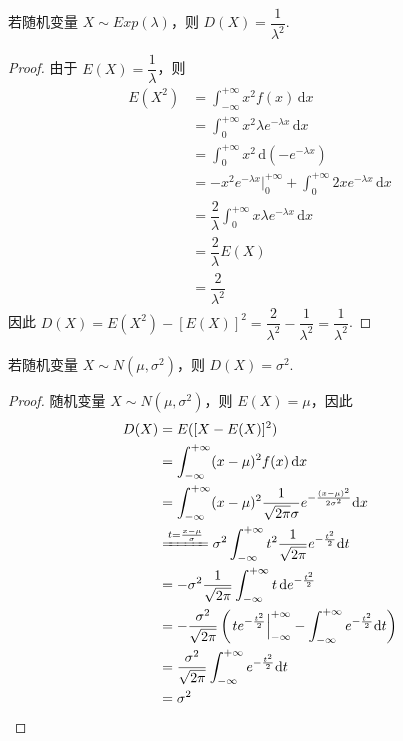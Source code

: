 \begin{conclusion}
    \indent 若随机变量 $X \sim Exp(\lambda)$，则 $D(X) = \dfrac{1}{\lambda^2}$.
\end{conclusion}

\begin{proof}
    由于 $E(X) = \dfrac{1}{\lambda}$，则
    $$
    \begin{aligned}
        E(X^2) &= \int_{-\infty}^{+\infty} x^2 f(x) \, \text{d}x \\
        &= \int_0^{+\infty} x^2 \lambda e^{-\lambda x} \, \text{d}x \\
        &= \int_0^{+\infty} x^2 \, \text{d}(-e^{-\lambda x}) \\
        &= -x^2 e^{-\lambda x} \Big|_0^{+\infty} + \int_0^{+\infty} 2x e^{-\lambda x} \, \text{d}x \\
        &= \dfrac{2}{\lambda} \int_0^{+\infty} x \lambda e^{-\lambda x} \, \text{d}x \\
        &= \dfrac{2}{\lambda} E(X) \\
        &= \dfrac{2}{\lambda^2}
    \end{aligned}
    $$
    因此 $D(X) = E(X^2) - [E(X)]^2 = \dfrac{2}{\lambda^2} - \dfrac{1}{\lambda^2} = \dfrac{1}{\lambda^2}$.
\end{proof}

\begin{conclusion}
    \indent 若随机变量 $X \sim N(\mu,\sigma^2)$，则 $D(X) = \sigma^2$.
\end{conclusion}

\begin{proof}
    随机变量 $X \sim N(\mu,\sigma^2)$，则 $E(X)=\mu$，因此
    $$
    \begin{aligned}
        D(X) &= E([X-E(X)]^2) \\
        &= \int_{-\infty}^{+\infty} (x-\mu)^2 f(x) \, \text{d}x \\
        &= \int_{-\infty}^{+\infty} (x-\mu)^2 \dfrac{1}{\sqrt{2 \pi} \sigma} e^{-\frac{(x-\mu)^2}{2 \sigma^2}} \text{d}x \\
        & \xlongequal{t = \frac{x-\mu}{\sigma}} \sigma^2 \int_{-\infty}^{+\infty} t^2 \dfrac{1}{\sqrt{2 \pi}} e^{-\frac{t^2}{2}} \text{d}t \\
        &= -\sigma^2 \dfrac{1}{\sqrt{2 \pi}} \int_{-\infty}^{+\infty} t \, \text{d} e^{-\frac{t^2}{2}} \\
        &= -\dfrac{\sigma^2}{\sqrt{2 \pi}} \left( \left. t e^{-\frac{t^2}{2}} \right|_{-\infty}^{+\infty} - \int_{-\infty}^{+\infty} e^{-\frac{t^2}{2}} \text{d}t \right) \\
        &= \dfrac{\sigma^2}{\sqrt{2 \pi}} \int_{-\infty}^{+\infty} e^{-\frac{t^2}{2}} \text{d}t \\
        &= \sigma^2
    \end{aligned}
    $$
\end{proof}

